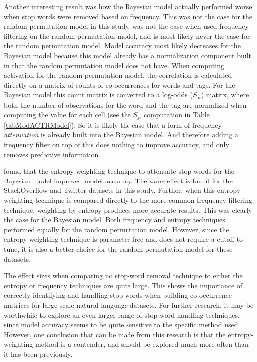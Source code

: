 \documentclass[man,floatsintext,donotrepeattitle]{apa6}
\begin{document}
Another interesting result was how the Bayesian model actually performed worse when stop words were removed based on frequency.
This was not the case for the random permutation model in this study, was not the case when \textcite{Sahlgren2008} used frequency filtering on the random permutation model,
and is most likely never the case for the random permutation model.
Model accuracy most likely decreases for the Bayesian model because this model already has a normalization component built in that the random permutation model does not have.
When computing activation for the random permutation model, the correlation is calculated directly on a matrix of counts of co-occurrences for words and tags.
For the Bayesian model this count matrix is converted to a log-odds ($S_{ji}$) matrix,
where both the number of observations for the word and the tag are normalized when computing the value for each cell (see the $S_{ji}$ computation in Table \ref{tabModACTRModel}).
So it is likely the case that a form of frequency \emph{attenuation} is already built into the Bayesian model.
And therefore adding a frequency filter on top of this does nothing to improve accuracy, and only removes predictive information.

\textcite{Stanley2013} found that the entropy-weighting technique to attenuate stop words for the Bayesian model improved model accuracy.
The same effect is found for the StackOverflow and Twitter datasets in this study.
Further, when this entropy-weighting technique is compared directly to the more common frequency-filtering technique, weighting by entropy produces more accurate results.
This was clearly the case for the Bayesian model.
Both frequency and entropy techniques performed equally for the random permutation model.
However, since the entropy-weighting technique is parameter free and does not require a cutoff to tune, it is also a better choice for the random permutation model for these datasets.

The effect sizes when comparing no stop-word removal technique to either the entropy or frequency techniques are quite large.
This shows the importance of correctly identifying and handling stop words when building co-occurrence matrices for large-scale natural language datasets.
For further research, it may be worthwhile to explore an even larger range of stop-word handling techniques,
since model accuracy seems to be quite sensitive to the specific method used. 
However, one conclusion that can be made from this research is that the entropy-weighting method is a contender, and should be explored much more often than it has been previously.
\end{document}
